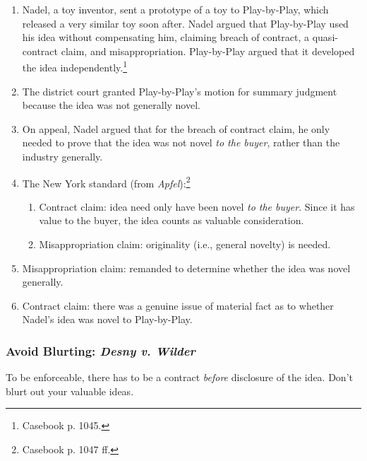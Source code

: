 \begin{enumerate}
    \item Nadel, a toy inventor, sent a prototype of a toy to Play-by-Play, 
    which released a very similar toy soon after. Nadel argued that 
    Play-by-Play used his idea without compensating him, claiming breach of 
    contract, a quasi-contract claim, and misappropriation. Play-by-Play 
    argued that it developed the idea independently.\footnote{Casebook p.  
    1045.}
    \item The district court granted Play-by-Play's motion for summary 
    judgment because the idea was not generally novel.
    \item On appeal, Nadel argued that for the breach of contract claim, he 
    only needed to prove that the idea was not novel \emph{to the buyer}, 
    rather than the industry generally.
    \item The New York standard (from \emph{Apfel}):\footnote{Casebook p. 1047 
    ff.}
    \begin{enumerate}
        \item Contract claim: idea need only have been novel \emph{to the 
        buyer}. Since it has value to the buyer, the idea counts as valuable 
        consideration.
        \item Misappropriation claim: originality (i.e., general novelty) is 
        needed.
    \end{enumerate}
    \item Misappropriation claim: remanded to determine whether the idea was 
    novel generally.
    \item Contract claim: there was a genuine issue of material fact as to 
    whether Nadel's idea was novel to Play-by-Play.
\end{enumerate}

\subsubsection{Avoid Blurting: \emph{Desny v. Wilder}}

To be enforceable, there has to be a contract \emph{before} disclosure of the 
idea. Don't blurt out your valuable ideas.


